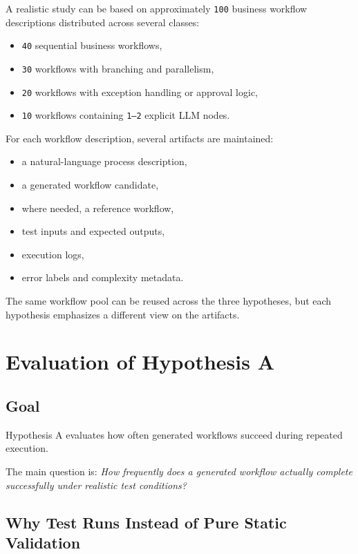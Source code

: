 \documentclass[12pt,a4paper]{article}
\begin{document}
A realistic study can be based on approximately \texttt{100} business workflow descriptions distributed across several classes:

\begin{itemize}
  \item \texttt{40} sequential business workflows,
  \item \texttt{30} workflows with branching and parallelism,
  \item \texttt{20} workflows with exception handling or approval logic,
  \item \texttt{10} workflows containing \texttt{1--2} explicit LLM nodes.
\end{itemize}

For each workflow description, several artifacts are maintained:

\begin{itemize}
  \item a natural-language process description,
  \item a generated workflow candidate,
  \item where needed, a reference workflow,
  \item test inputs and expected outputs,
  \item execution logs,
  \item error labels and complexity metadata.
\end{itemize}

The same workflow pool can be reused across the three hypotheses, but each hypothesis emphasizes a different view on the artifacts.

\section{Evaluation of Hypothesis A}

\subsection{Goal}

Hypothesis A evaluates how often generated workflows succeed during repeated execution.

The main question is: \emph{How frequently does a generated workflow actually complete successfully under realistic test conditions?}

\subsection{Why Test Runs Instead of Pure Static Validation}
\end{document}

